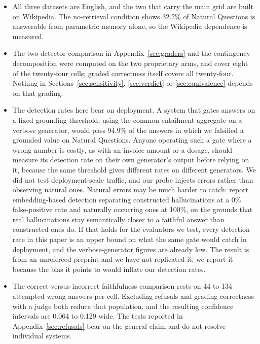 \documentclass[11pt]{article}
\begin{document}
\begin{itemize}
\item All three datasets are English, and the two that carry the main grid are built on Wikipedia. The no-retrieval condition shows 32.2\% of Natural Questions is answerable from parametric memory alone, so the Wikipedia dependence is measured.
\item The two-detector comparison in Appendix~\ref{sec:graders} and the contingency decomposition were computed on the two proprietary arms, and cover eight of the twenty-four cells; graded correctness itself covers all twenty-four. Nothing in Sections~\ref{sec:sensitivity}, \ref{sec:verdict} or \ref{sec:equivalence} depends on that grading.

\item The detection rates here bear on deployment. A system that gates answers on a fixed grounding threshold, using the common entailment aggregate on a verbose generator, would pass 94.9\% of the answers in which we falsified a grounded value on Natural Questions. Anyone operating such a gate where a wrong number is costly, as with an invoice amount or a dosage, should measure its detection rate on their own generator's output before relying on it, because the same threshold gives different rates on different generators. We did not test deployment-scale traffic, and our probe injects errors rather than observing natural ones. Natural errors may be much harder to catch: \citet{sinha-2025} report embedding-based detection separating constructed hallucinations at a 0\% false-positive rate and naturally occurring ones at 100\%, on the grounds that real hallucinations stay semantically closer to a faithful answer than constructed ones do. If that holds for the evaluators we test, every detection rate in this paper is an upper bound on what the same gate would catch in deployment, and the verbose-generator figures are already low. The result is from an unrefereed preprint and we have not replicated it; we report it because the bias it points to would inflate our detection rates.

\item The correct-versus-incorrect faithfulness comparison rests on 44 to 134 attempted wrong answers per cell. Excluding refusals and grading correctness with a judge both reduce that population, and the resulting confidence intervals are 0.064 to 0.129 wide. The tests reported in Appendix~\ref{sec:refusals} bear on the general claim and do not resolve individual systems.
\end{itemize}


\end{document}
